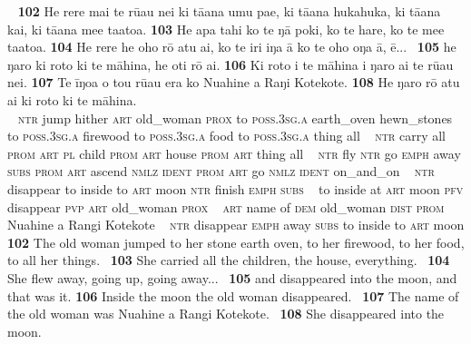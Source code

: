 {~
\newpage
\gll
\textbf{\textup{102}} He rere mai te rū{\ꞌ}au nei ki tā{\ꞌ}ana {\ꞌ}umu pae, ki tā{\ꞌ}ana hukahuka, ki tā{\ꞌ}ana kai, ki tā{\ꞌ}ana me{\ꞌ}e ta{\ꞌ}ato{\ꞌ}a. \textbf{\textup{103}} He {\ꞌ}apa tahi ko te ŋā poki, ko te hare, ko te me{\ꞌ}e ta{\ꞌ}ato{\ꞌ}a. \textbf{\textup{104}} He rere he oho rō atu {\ꞌ}ai, ko te iri iŋa {\ꞌ}ā ko te oho oŋa {\ꞌ}ā, ē... ~\textbf{\textup{105}} he ŋaro ki roto ki te māhina, he oti rō {\ꞌ}ai. \textbf{\textup{106}} Ki roto i te māhina i ŋaro ai te rū{\ꞌ}au nei. \textbf{\textup{107}} Te {\ꞌ}īŋoa o tou rū{\ꞌ}au era ko Nuahine {\ꞌ}a Raŋi Kotekote. \textbf{\textup{108}} He ŋaro rō atu {\ꞌ}ai ki roto ki te māhina.\\
~ \textsc{ntr} jump hither \textsc{art} old\_woman \textsc{prox} to \textsc{poss.3sg.a} earth\_oven hewn\_stones to \textsc{poss.3sg.a} firewood to \textsc{poss.3sg.a} food to \textsc{poss.3sg.a} thing all  ~ \textsc{ntr} carry all \textsc{prom} \textsc{art} \textsc{pl} child \textsc{prom} \textsc{art} house \textsc{prom} \textsc{art} thing all  ~ \textsc{ntr} fly \textsc{ntr} go \textsc{emph} away \textsc{subs} \textsc{prom} \textsc{art} ascend \textsc{nmlz} \textsc{ident} \textsc{prom} \textsc{art} go \textsc{nmlz} \textsc{ident} on\_and\_on ~ \textsc{ntr} disappear to inside to \textsc{art} moon \textsc{ntr} finish \textsc{emph} \textsc{subs}  ~ to inside at \textsc{art} moon \textsc{pfv} disappear \textsc{pvp} \textsc{art} old\_woman \textsc{prox}  ~ \textsc{art} name of \textsc{dem} old\_woman \textsc{dist} \textsc{prom} Nuahine a Rangi Kotekote  ~ \textsc{ntr} disappear \textsc{emph} away \textsc{subs} to inside to \textsc{art} moon\\

\medskip\glt
\textbf{\textup{102}} The old woman jumped to her stone earth oven, to her firewood, to her food, to all her things. ~\textbf{\textup{103}} She carried all the children, the house, everything. ~\textbf{\textup{104}} She flew away, going up, going away... ~\textbf{\textup{105}} and disappeared into the moon, and that was it. \textbf{\textup{106}} Inside the moon the old woman disappeared. ~\textbf{\textup{107}} The name of the old woman was Nuahine a Rangi Kotekote. ~\textbf{\textup{108}} She disappeared into the moon.


~

}
